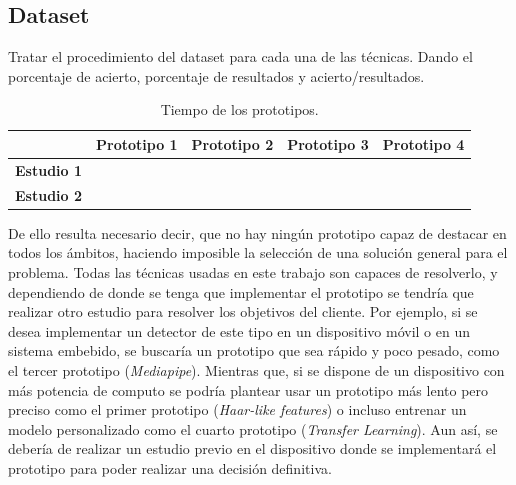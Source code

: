 \vspace{-0.5cm}
\subsection*{Dataset}
\vspace{-0.5cm}

Tratar el procedimiento del dataset para cada una de las técnicas. Dando el porcentaje de acierto, porcentaje de resultados y acierto/resultados.

\begin{table}[h!]
	\begin{center}
		\begin{tabular}{ |c|c|c|c|c| } 
			\hline
			& \textbf{Prototipo 1} & \textbf{Prototipo 2} & \textbf{Prototipo 3} & \textbf{Prototipo 4} \\
			\hline
			\textbf{Estudio 1} &  &  &  &  \\
			\hline
			\textbf{Estudio 2} &  &   &  &  \\
			\hline
		\end{tabular}
		\caption{Tiempo de los prototipos.}
		\label{tab:table4}
	\end{center}
\end{table}


De ello resulta necesario decir, que no hay ningún prototipo capaz de destacar en todos los ámbitos, haciendo imposible la selección de una solución general para el problema. Todas las técnicas usadas en este trabajo son capaces de resolverlo, y dependiendo de donde se tenga que implementar el prototipo se tendría que realizar otro estudio para resolver los objetivos del cliente. Por ejemplo,  si se desea implementar un detector de este tipo en un dispositivo móvil o en un sistema embebido, se buscaría un prototipo que sea rápido y poco pesado, como el tercer prototipo (\textit{Mediapipe}). Mientras que, si se dispone de un dispositivo con más potencia de computo se podría plantear usar un prototipo más lento pero preciso como el primer prototipo (\textit{Haar-like features}) o incluso entrenar un modelo personalizado como el cuarto prototipo (\textit{Transfer Learning}). Aun así, se debería de realizar un estudio previo en el dispositivo donde se implementará el prototipo para poder realizar una decisión definitiva.  



